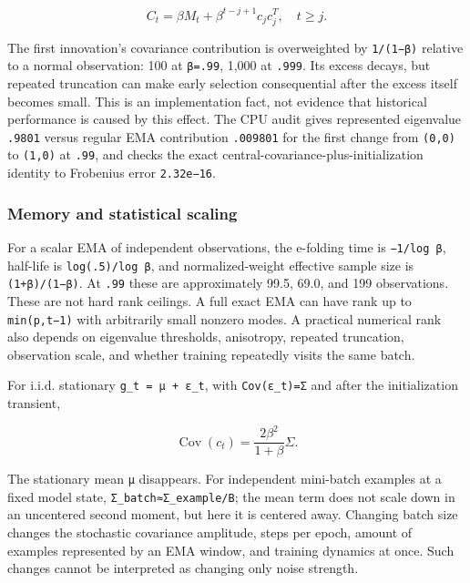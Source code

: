 \documentclass[
  british,
  10pt,
  a4paper,
]{article}
\begin{document}
\[
C_t=\beta M_t+\beta^{t-j+1}c_jc_j^T,\quad t\ge j.
\]

The first innovation's covariance contribution is overweighted by
\texttt{1/(1−β)} relative to a normal observation: 100 at
\texttt{β=.99}, 1,000 at \texttt{.999}. Its excess decays, but repeated
truncation can make early selection consequential after the excess
itself becomes small. This is an implementation fact, not evidence that
historical performance is caused by this effect. The CPU audit gives
represented eigenvalue \texttt{.9801} versus regular EMA contribution
\texttt{.009801} for the first change from \texttt{(0,0)} to
\texttt{(1,0)} at \texttt{.99}, and checks the exact
central-\allowbreak{}covariance-\allowbreak{}plus-\allowbreak{}initializati\allowbreak{}on
identity to Frobenius error \texttt{2.32e−16}.

\subsubsection{Memory and statistical
scaling}\label{mathematical-audit--memory-and-statistical-scaling}

For a scalar EMA of independent observations\allowbreak{},\allowbreak{}
the e-folding time is \texttt{−1/log\ β}, half-life is
\texttt{log(.\allowbreak{}5)/\allowbreak{}log \allowbreak{}β}, and
normalized-\allowbreak{}weight effective sample size is
\texttt{(1+β)/\allowbreak{}(1−β)}. At \texttt{.99} these are
approximately 99.5, 69.0, and 199
observations\allowbreak{}.\allowbreak{} These are not hard rank
ceilings. A full exact EMA can have rank up to \texttt{min(p,t−1)} with
arbitrarily small nonzero modes. A practical numerical rank also depends
on eigenvalue thresholds,\allowbreak{} anisotropy,\allowbreak{} repeated
truncation,\allowbreak{} observation scale, and whether training
repeatedly visits the same batch.

For i.i.d. stationary
\texttt{g\_\allowbreak{}t \allowbreak{}=\allowbreak{} \allowbreak{}μ \allowbreak{}+ \allowbreak{}ε\_\allowbreak{}t},
with \texttt{Cov(ε\_t)=Σ} and after the initialization transient,

\[
\operatorname{Cov}(c_t)=\frac{2\beta^2}{1+\beta}\Sigma.
\]

The stationary mean \texttt{μ} disappears.\allowbreak{} For independent
mini-batch examples at a fixed model state,
\texttt{Σ\_\allowbreak{}batch≈Σ\_\allowbreak{}example/\allowbreak{}B};
the mean term does not scale down in an uncentered second moment, but
here it is centered away. Changing batch size changes the stochastic
covariance amplitude, steps per epoch, amount of examples represented by
an EMA window, and training dynamics at once. Such changes cannot be
interpreted as changing only noise strength.
\end{document}
